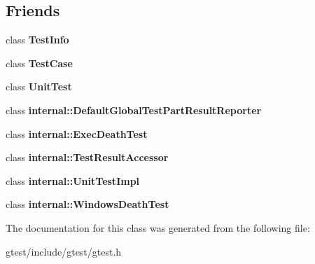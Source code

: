 \subsection*{Friends}
\begin{DoxyCompactItemize}
\item 
\mbox{\label{classtesting_1_1TestResult_a4c49c2cdb6c328e6b709b4542f23de3c}} 
class {\bfseries Test\+Info}
\item 
\mbox{\label{classtesting_1_1TestResult_aff779e55b06adfa7c0088bd10253f0f0}} 
class {\bfseries Test\+Case}
\item 
\mbox{\label{classtesting_1_1TestResult_a832b4d233efee1a32feb0f4190b30d39}} 
class {\bfseries Unit\+Test}
\item 
\mbox{\label{classtesting_1_1TestResult_abae39633da9932847b41cb80efd62115}} 
class {\bfseries internal\+::\+Default\+Global\+Test\+Part\+Result\+Reporter}
\item 
\mbox{\label{classtesting_1_1TestResult_adf5553cae6aea6f8648d47e299237e34}} 
class {\bfseries internal\+::\+Exec\+Death\+Test}
\item 
\mbox{\label{classtesting_1_1TestResult_ae762da04e74a0d3b0daded3c5bd4a8e8}} 
class {\bfseries internal\+::\+Test\+Result\+Accessor}
\item 
\mbox{\label{classtesting_1_1TestResult_acc0a5e7573fd6ae7ad1878613bb86853}} 
class {\bfseries internal\+::\+Unit\+Test\+Impl}
\item 
\mbox{\label{classtesting_1_1TestResult_a6aeedc04a0590fcc1b3c5f687dbb0f9f}} 
class {\bfseries internal\+::\+Windows\+Death\+Test}
\end{DoxyCompactItemize}


The documentation for this class was generated from the following file\+:\begin{DoxyCompactItemize}
\item 
gtest/include/gtest/gtest.\+h\end{DoxyCompactItemize}
